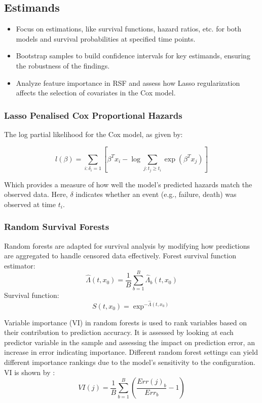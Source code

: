\subsection{Estimands}
\begin{itemize}
\item Focus on estimations, like survival functions, hazard ratios, etc. for both models and survival probabilities at specified time points.
\item Bootstrap samples to build confidence intervals for key estimands, ensuring the robustness of the findings.
\item Analyze feature importance in RSF and assess how Lasso regularization affects the selection of covariates in the Cox model.
\end{itemize}

\subsubsection*{Lasso Penalised Cox Proportional Hazards}
The log partial likelihood for the Cox model, as given by:

\begin{equation} \label{eq:likelihood}l(\beta) = \sum_{i:\delta_{i}=1} \left[ \beta^{T}x_{i} - \log{\sum_{j:t_{j}\ge t_{i}} \exp(\beta^{T}x_{j})} \right]\end{equation}

\noindent Which provides a measure of how well the model's predicted hazards match the observed data. Here, \(\delta\) indicates whether an event (e.g., failure, death) was observed at time \(t_{i}\). 

\subsubsection*{Random Survival Forests}
Random forests are adapted for survival analysis by modifying how predictions are aggregated to handle censored data effectively. Forest survival function estimator:
\begin{equation} \label{eq:rsfestimator}\hat{\Lambda}(t, x_{0}) = \frac{1}{B} \sum_{b=1}^{B} \hat{\Lambda}_{b}(t,x_{0})\end{equation}
Survival function:
\begin{equation} \label{eq:survrsf}S(t,x_{0}) = \exp^{-\hat{\Lambda}(t,x_{0})}\end{equation}

\noindent Variable importance (VI) \parencite{pham_springer_2023} in random forests is used to rank variables based on their contribution to prediction accuracy. It is assessed by looking at each predictor variable in the sample and assessing the impact on prediction error, an increase in error indicating importance. Different random forest settings can yield different importance rankings due to the model's sensitivity to the configuration. VI is shown by \parencite{pham_springer_2023}:
\begin{equation} \label{eq:vinorm}
VI(j) = \frac{1}{B}\sum_{b=1}^{B}(\frac{Err(j)_{b}}{Err_{b}}-1)
\end{equation}

